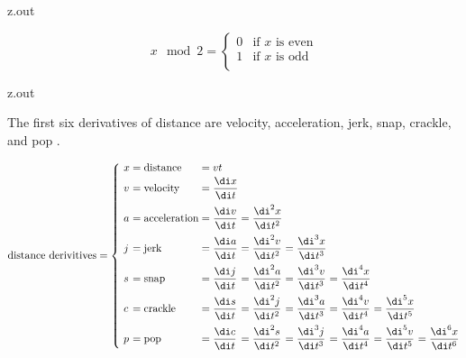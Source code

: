 \MyIO


\begin{VerbatimOut}{z.out}

\begin{equation}
  x \mod 2 =
  \begin{cases}
    0& \text{if $x$ is even}\\
    1& \text{if $x$ is odd}\\
  \end{cases}
\end{equation}
\end{VerbatimOut}

\MyIO


\begin{VerbatimOut}{z.out}

The first six derivatives of distance are velocity, acceleration, jerk, snap, crackle,
and pop \cite{reid2013}.

\begin{equation}
  \AtBeginEnvironment{array}{\everymath{\displaystyle}}
  \arraycolsep = 0pt
  \text{distance derivitives} = \left\{\ %
    \begin{array}{llllllll}
      x&      {}=\text{distance}&     {}=vt\\[2pt]
      v&      {}=\text{velocity}&     {}=\frac{\di x}{\di t}\\[9pt]
      a&      {}=\text{acceleration}& {}=\frac{\di v}{\di t}& {}=\frac{\di^2x}{\di t^2}\\[9pt]
      \mit j& {}=\text{jerk}&         {}=\frac{\di a}{\di t}& {}=\frac{\di^2v}{\di t^2}&
        {}=\frac{\di^3x}{\di t^3}\\[9pt]
      s
        & {}=\text{snap}
        & {}=\frac{\di \mit j}{\di t}
        & {}=\frac{\di^2a}{\di t^2}
        & {}=\frac{\di^3v}{\di t^3}
        & {}=\frac{\di^4x}{\di t^4}\\[9pt]
      c
        & {}=\text{crackle}
        & {}=\frac{\di s}{\di t}
        & {}=\frac{\di^2\mit j}{\di t^2}
        & {}=\frac{\di^3a}{\di t^3}
        & {}=\frac{\di^4v}{\di t^4}
        & {}=\frac{\di^5x}{\di t^5}\\[9pt]
      p
        & {}=\text{pop}
        & {}=\frac{\di c}{\di t}
        & {}=\frac{\di^2s}{\di t^2}
        & {}=\frac{\di^3\mit j}{\di t^3}
        & {}=\frac{\di^4a}{\di t^4}
        & {}=\frac{\di^5v}{\di t^5}
        & {}=\frac{\di^6x}{\di t^6}
    \end{array}
  \right.
\end{equation}
\end{VerbatimOut}


